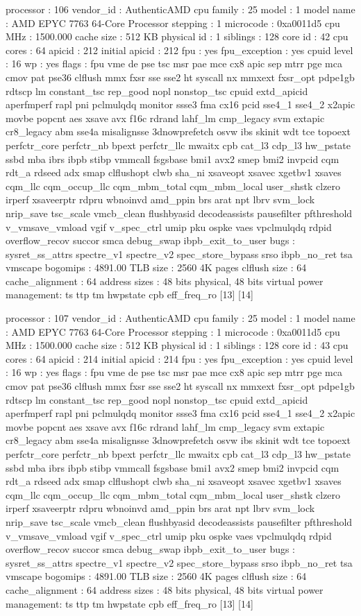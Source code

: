 processor	: 106
vendor_id	: AuthenticAMD
cpu family	: 25
model		: 1
model name	: AMD EPYC 7763 64-Core Processor
stepping	: 1
microcode	: 0xa0011d5
cpu MHz		: 1500.000
cache size	: 512 KB
physical id	: 1
siblings	: 128
core id		: 42
cpu cores	: 64
apicid		: 212
initial apicid	: 212
fpu		: yes
fpu_exception	: yes
cpuid level	: 16
wp		: yes
flags		: fpu vme de pse tsc msr pae mce cx8 apic sep mtrr pge mca cmov pat pse36 clflush mmx fxsr sse sse2 ht syscall nx mmxext fxsr_opt pdpe1gb rdtscp lm constant_tsc rep_good nopl nonstop_tsc cpuid extd_apicid aperfmperf rapl pni pclmulqdq monitor ssse3 fma cx16 pcid sse4_1 sse4_2 x2apic movbe popcnt aes xsave avx f16c rdrand lahf_lm cmp_legacy svm extapic cr8_legacy abm sse4a misalignsse 3dnowprefetch osvw ibs skinit wdt tce topoext perfctr_core perfctr_nb bpext perfctr_llc mwaitx cpb cat_l3 cdp_l3 hw_pstate ssbd mba ibrs ibpb stibp vmmcall fsgsbase bmi1 avx2 smep bmi2 invpcid cqm rdt_a rdseed adx smap clflushopt clwb sha_ni xsaveopt xsavec xgetbv1 xsaves cqm_llc cqm_occup_llc cqm_mbm_total cqm_mbm_local user_shstk clzero irperf xsaveerptr rdpru wbnoinvd amd_ppin brs arat npt lbrv svm_lock nrip_save tsc_scale vmcb_clean flushbyasid decodeassists pausefilter pfthreshold v_vmsave_vmload vgif v_spec_ctrl umip pku ospke vaes vpclmulqdq rdpid overflow_recov succor smca debug_swap ibpb_exit_to_user
bugs		: sysret_ss_attrs spectre_v1 spectre_v2 spec_store_bypass srso ibpb_no_ret tsa vmscape
bogomips	: 4891.00
TLB size	: 2560 4K pages
clflush size	: 64
cache_alignment	: 64
address sizes	: 48 bits physical, 48 bits virtual
power management: ts ttp tm hwpstate cpb eff_freq_ro [13] [14]

processor	: 107
vendor_id	: AuthenticAMD
cpu family	: 25
model		: 1
model name	: AMD EPYC 7763 64-Core Processor
stepping	: 1
microcode	: 0xa0011d5
cpu MHz		: 1500.000
cache size	: 512 KB
physical id	: 1
siblings	: 128
core id		: 43
cpu cores	: 64
apicid		: 214
initial apicid	: 214
fpu		: yes
fpu_exception	: yes
cpuid level	: 16
wp		: yes
flags		: fpu vme de pse tsc msr pae mce cx8 apic sep mtrr pge mca cmov pat pse36 clflush mmx fxsr sse sse2 ht syscall nx mmxext fxsr_opt pdpe1gb rdtscp lm constant_tsc rep_good nopl nonstop_tsc cpuid extd_apicid aperfmperf rapl pni pclmulqdq monitor ssse3 fma cx16 pcid sse4_1 sse4_2 x2apic movbe popcnt aes xsave avx f16c rdrand lahf_lm cmp_legacy svm extapic cr8_legacy abm sse4a misalignsse 3dnowprefetch osvw ibs skinit wdt tce topoext perfctr_core perfctr_nb bpext perfctr_llc mwaitx cpb cat_l3 cdp_l3 hw_pstate ssbd mba ibrs ibpb stibp vmmcall fsgsbase bmi1 avx2 smep bmi2 invpcid cqm rdt_a rdseed adx smap clflushopt clwb sha_ni xsaveopt xsavec xgetbv1 xsaves cqm_llc cqm_occup_llc cqm_mbm_total cqm_mbm_local user_shstk clzero irperf xsaveerptr rdpru wbnoinvd amd_ppin brs arat npt lbrv svm_lock nrip_save tsc_scale vmcb_clean flushbyasid decodeassists pausefilter pfthreshold v_vmsave_vmload vgif v_spec_ctrl umip pku ospke vaes vpclmulqdq rdpid overflow_recov succor smca debug_swap ibpb_exit_to_user
bugs		: sysret_ss_attrs spectre_v1 spectre_v2 spec_store_bypass srso ibpb_no_ret tsa vmscape
bogomips	: 4891.00
TLB size	: 2560 4K pages
clflush size	: 64
cache_alignment	: 64
address sizes	: 48 bits physical, 48 bits virtual
power management: ts ttp tm hwpstate cpb eff_freq_ro [13] [14]

